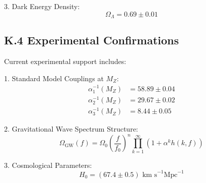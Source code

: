 3. Dark Energy Density:
   \[
   \Omega_\Lambda = 0.69 \pm 0.01
   \]

\subsection*{K.4 Experimental Confirmations}
\label{subsec:experimental_confirmations}

Current experimental support includes:

1. Standard Model Couplings at $M_Z$:
   \begin{align*}
   \alpha_1^{-1}(M_Z) &= 58.89 \pm 0.04 \\
   \alpha_2^{-1}(M_Z) &= 29.67 \pm 0.02 \\
   \alpha_3^{-1}(M_Z) &= 8.44 \pm 0.05
   \end{align*}

2. Gravitational Wave Spectrum Structure:
   \[
   \Omega_{\text{GW}}(f) = \Omega_0\left(\frac{f}{f_0}\right)^n \prod_{k=1}^{\infty} \left(1 + \alpha^k h(k,f)\right)
   \]

3. Cosmological Parameters:
   \[
   H_0 = (67.4 \pm 0.5) \text{ km s}^{-1} \text{Mpc}^{-1}
   \] 